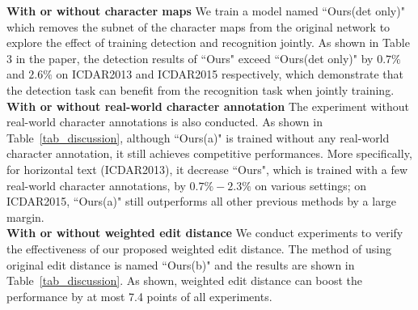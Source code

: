 \documentclass[runningheads]{llncs}
\begin{document}
\noindent\textbf{With or without character maps} We train a model named ``Ours(det only)" which removes the subnet of the character maps from the original network to explore the effect of training detection and recognition jointly. As shown in Table 3 in the paper, the detection results of ``Ours" exceed ``Ours(det only)" by $0.7\%$ and $2.6\%$ on ICDAR2013 and ICDAR2015 respectively,  which demonstrate that the detection task can  benefit from the recognition task when jointly training.
\\
\textbf{With or without real-world character annotation} The experiment without real-world character annotations is also conducted. As shown in Table~\ref{tab_discussion},  although ``Ours(a)" is trained without any real-world character annotation, it still achieves competitive performances. More specifically, for horizontal text (ICDAR2013), it decrease ``Ours", which is trained with a few real-world character annotations, by  $0.7\%-2.3\%$ on various settings; on ICDAR2015, ``Ours(a)" still outperforms all other previous methods by a large margin.
\\
\textbf{With or without weighted edit distance} We conduct experiments to verify the effectiveness of our proposed weighted edit distance. The method of using original edit distance is named ``Ours(b)" and the results are shown in Table~\ref{tab_discussion}. As shown, weighted edit distance can boost the performance by at most 7.4 points of all experiments. 
\end{document}
